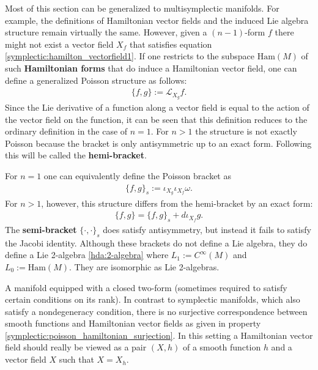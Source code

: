     \begin{remark}\label{symplectic:hamiltonian_forms}
        Most of this section can be generalized to multisymplectic manifolds. For example, the definitions of Hamiltonian vector fields and the induced Lie algebra structure remain virtually the same. However, given a $(n-1)$-form $f$ there might not exist a vector field $X_f$ that satisfies equation \ref{symplectic:hamilton_vectorfield1}. If one restricts to the subspace $\text{Ham}(M)$ of such \textbf{Hamiltonian forms} that do induce a Hamiltonian vector field, one can define a generalized Poisson structure as follows:
        \begin{gather}
            \{f, g\} := \mathcal{L}_{X_g}f.
        \end{gather}
        Since the Lie derivative of a function along a vector field is equal to the action of the vector field on the function, it can be seen that this definition reduces to the ordinary definition in the case of $n=1$. For $n>1$ the structure is not exactly Poisson because the bracket is only antisymmetric up to an exact form. Following \cite{category_symplectic} this will be called the \textbf{hemi-bracket}.

        For $n=1$ one can equivalently define the Poisson bracket as
        \begin{gather}
            \{f,g\}_s := \iota_{X_g}\iota_{X_f}\omega.
        \end{gather}
        For $n>1$, however, this structure differs from the hemi-bracket by an exact form:
        \begin{gather}
            \{f,g\} = \{f,g\}_s + d\iota_{X_f}g.
        \end{gather}
        The \textbf{semi-bracket} $\{\cdot,\cdot\}_s$ does satisfy antisymmetry, but instead it fails to satisfy the Jacobi identity. Although these brackets do not define a Lie algebra, they do define a Lie 2-algebra \ref{hda:2-algebra} where $L_1:=C^\infty(M)$ and $L_0:=\text{Ham}(M)$. They are isomorphic as Lie 2-algebras.
    \end{remark}

    \begin{remark}
        A manifold equipped with a closed two-form (sometimes required to satisfy certain conditions on its rank). In contrast to symplectic manifolds, which also satisfy a nondegeneracy condition, there is no surjective correspondence between smooth functions and Hamiltonian vector fields as given in property \ref{symplectic:poisson_hamiltonian_surjection}. In this setting a Hamiltonian vector field should really be viewed as a pair $(X,h)$ of a smooth function $h$ and a vector field $X$ such that $X = X_h$.
    \end{remark}

